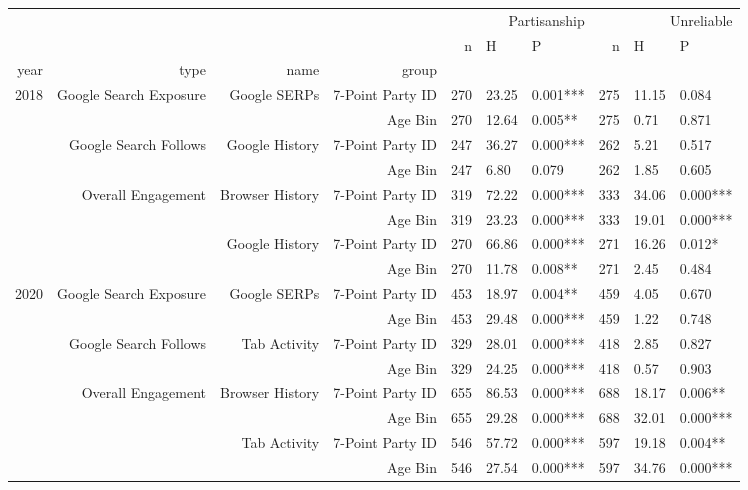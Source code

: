 \begin{tabular}{rrrrrllrll}
 &  &  &  & \multicolumn{3}{r}{Partisanship} & \multicolumn{3}{r}{Unreliable} \\
 &  &  &  & n & H & P & n & H & P \\
year & type & name & group &  &  &  &  &  &  \\
\multirow[c]{8}{*}{2018} & \multirow[c]{2}{*}{Google Search Exposure} & \multirow[c]{2}{*}{Google SERPs} & 7-Point Party ID & 270 & 23.25 & 0.001*** & 275 & 11.15 & 0.084 \\
 &  &  & Age Bin & 270 & 12.64 & 0.005** & 275 & 0.71 & 0.871 \\
 & \multirow[c]{2}{*}{Google Search Follows} & \multirow[c]{2}{*}{Google History} & 7-Point Party ID & 247 & 36.27 & 0.000*** & 262 & 5.21 & 0.517 \\
 &  &  & Age Bin & 247 & 6.80 & 0.079 & 262 & 1.85 & 0.605 \\
 & \multirow[c]{4}{*}{Overall Engagement} & \multirow[c]{2}{*}{Browser History} & 7-Point Party ID & 319 & 72.22 & 0.000*** & 333 & 34.06 & 0.000*** \\
 &  &  & Age Bin & 319 & 23.23 & 0.000*** & 333 & 19.01 & 0.000*** \\
 &  & \multirow[c]{2}{*}{Google History} & 7-Point Party ID & 270 & 66.86 & 0.000*** & 271 & 16.26 & 0.012* \\
 &  &  & Age Bin & 270 & 11.78 & 0.008** & 271 & 2.45 & 0.484 \\
\multirow[c]{8}{*}{2020} & \multirow[c]{2}{*}{Google Search Exposure} & \multirow[c]{2}{*}{Google SERPs} & 7-Point Party ID & 453 & 18.97 & 0.004** & 459 & 4.05 & 0.670 \\
 &  &  & Age Bin & 453 & 29.48 & 0.000*** & 459 & 1.22 & 0.748 \\
 & \multirow[c]{2}{*}{Google Search Follows} & \multirow[c]{2}{*}{Tab Activity} & 7-Point Party ID & 329 & 28.01 & 0.000*** & 418 & 2.85 & 0.827 \\
 &  &  & Age Bin & 329 & 24.25 & 0.000*** & 418 & 0.57 & 0.903 \\
 & \multirow[c]{4}{*}{Overall Engagement} & \multirow[c]{2}{*}{Browser History} & 7-Point Party ID & 655 & 86.53 & 0.000*** & 688 & 18.17 & 0.006** \\
 &  &  & Age Bin & 655 & 29.28 & 0.000*** & 688 & 32.01 & 0.000*** \\
 &  & \multirow[c]{2}{*}{Tab Activity} & 7-Point Party ID & 546 & 57.72 & 0.000*** & 597 & 19.18 & 0.004** \\
 &  &  & Age Bin & 546 & 27.54 & 0.000*** & 597 & 34.76 & 0.000*** \\
\end{tabular}
